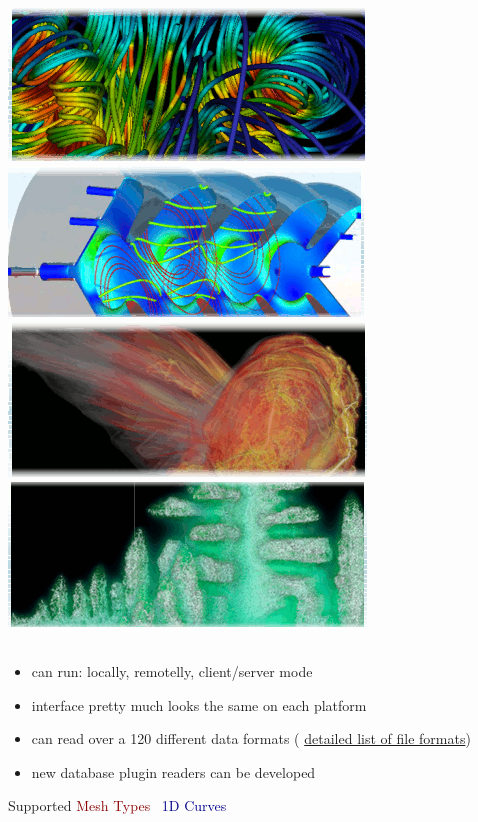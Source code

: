 \begin{frame}
\frametitle{\href{https://wci.llnl.gov/simulation/computer-codes/visit/}{\includegraphics[height=.85cm]{figs/visit-logos/VisIt-01}} \href{https://wci.llnl.gov/simulation/computer-codes/visit/}{\includegraphics[height=.875cm]{figs/visit-logos/VisIt-02}} \href{https://wci.llnl.gov/simulation/computer-codes/visit/}{\includegraphics[height=.875cm]{figs/visit-logos/VisIt-03}} \href{https://wci.llnl.gov/simulation/computer-codes/visit/}{\includegraphics[height=.875cm]{figs/visit-logos/VisIt-04}} \hspace{-8.5cm}{\bf \textcolor{white}{VisIt}}}

\begin{columns}
\begin{column}{5.5cm}
\begin{itemize}
        \item can run: locally, remotelly, client/server mode
        \item interface pretty much looks the same on each platform
        \item can read over a 120 different data formats ( \href{http://www.visitusers.org/index.php?title=Detailed_list_of_file_formats_VisIt_supports}{\small detailed list of file formats})
        \item new database plugin readers can be developed
\end{itemize}
\pause
\begin{beamerboxesrounded}[upper=block head,lower=block body,shadow=true]{ Supported \textcolor{DarkRed}{Mesh Types} }
        ~\textcolor{DarkBlue}{1D Curves}


\end{beamerboxesrounded}
\end{column}
\end{columns}
\end{frame}
